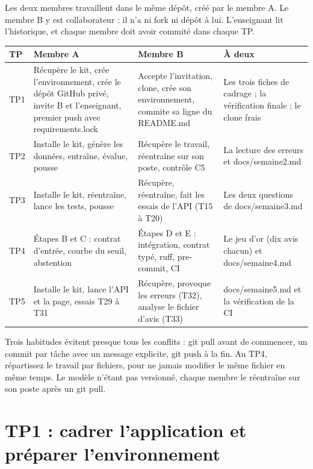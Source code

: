 \documentclass[11pt,a4paper]{article}
\newcommand{\co}[1]{{\ttfamily\hyphenchar\font=45\relax #1}}
\begin{document}
Les deux membres travaillent dans le même dépôt, créé par le membre A. Le membre B y est collaborateur : il
n'a ni fork ni dépôt à lui. L'enseignant lit l'historique, et chaque membre doit avoir commité dans chaque TP.

\begin{center}
\begin{tabularx}{\textwidth}{@{}l X X X@{}}
\toprule
\textbf{TP} & \textbf{Membre A} & \textbf{Membre B} & \textbf{À deux} \\
\midrule
TP1 & Récupère le kit, crée l'environnement, crée le dépôt GitHub privé, invite B et l'enseignant, premier
push avec \co{requirements.lock} & Accepte l'invitation, clone, crée son environnement, commite sa ligne du
\co{README.md} & Les trois fiches de cadrage ; la vérification finale ; le clone frais \\
TP2 & Installe le kit, génère les données, entraîne, évalue, pousse & Récupère le travail, réentraîne sur son
poste, contrôle C5 & La lecture des erreurs et \co{docs/semaine2.md} \\
TP3 & Installe le kit, réentraîne, lance les tests, pousse & Récupère, réentraîne, fait les essais de
l'API (T15 à T20) & Les deux questions de \co{docs/semaine3.md} \\
TP4 & Étapes B et C : contrat d'entrée, courbe du seuil, abstention & Étapes D et E : intégration, contrat
typé, ruff, pre-commit, CI & Le jeu d'or (dix avis chacun) et \co{docs/semaine4.md} \\
TP5 & Installe le kit, lance l'API et la page, essais T29 à T31 & Récupère, provoque les erreurs (T32),
analyse le fichier d'avis (T33) & \co{docs/semaine5.md} et la vérification de la CI \\
\bottomrule
\end{tabularx}
\end{center}

Trois habitudes évitent presque tous les conflits : \co{git pull} avant de commencer, un commit par tâche
avec un message explicite, \co{git push} à la fin. Au TP4, répartissez le travail par fichiers, pour ne
jamais modifier le même fichier en même temps. Le modèle n'étant pas versionné, chaque membre le
réentraîne sur son poste après un \co{git pull}.

\section{TP1 : cadrer l'application et préparer l'environnement}
\end{document}
